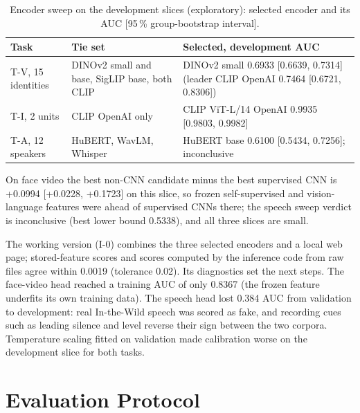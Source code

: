 \documentclass[conference,a4paper]{IEEEtran_nodash}
\begin{document}
\begin{table}[!t]
\centering
\caption[Encoder sweep outcome]{Encoder sweep on the development slices
(exploratory): selected encoder and its AUC [95\,\% group-bootstrap interval].}
\label{tab:sweep}
\footnotesize
\setlength{\tabcolsep}{3pt}
\begin{tabular}{@{}L{1.0cm} L{2.35cm} L{4.45cm}@{}}
\toprule
Task & Tie set & Selected, development AUC \\
\midrule
T-V, 15 identities & DINOv2 small and base, SigLIP base, both CLIP &
DINOv2 small 0.6933 [0.6639, 0.7314] (leader CLIP OpenAI 0.7464 [0.6721, 0.8306]) \\
\addlinespace[2pt]
T-I, 2 units & CLIP OpenAI only & CLIP ViT-L/14 OpenAI 0.9935 [0.9803, 0.9982] \\
\addlinespace[2pt]
T-A, 12 speakers & HuBERT, WavLM, Whisper & HuBERT base 0.6100 [0.5434, 0.7256]; inconclusive \\
\bottomrule
\end{tabular}
\end{table}

On face video the best non-CNN candidate minus the best supervised CNN is +0.0994
[+0.0228, +0.1723] on this slice, so frozen self-supervised and vision-language
features were ahead of supervised CNNs there; the speech sweep verdict is
inconclusive (best lower bound 0.5338), and all three slices are small.

The working version (I-0) combines the three selected encoders and a local web
page; stored-feature scores and scores computed by the inference code from raw
files agree within 0.0019 (tolerance 0.02). Its diagnostics
set the next steps. The face-video head reached a training AUC of only 0.8367
(the frozen feature underfits its own training data). The speech head lost 0.384
AUC from validation to development: real In-the-Wild speech was scored as fake,
and recording cues such as leading silence and level reverse their sign between
the two corpora. Temperature scaling fitted on validation made calibration worse
on the development slice for both tasks.

\section{Evaluation Protocol}\label{sec:protocol}
\end{document}
